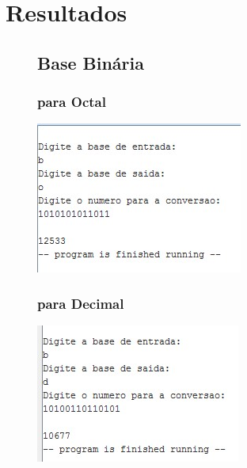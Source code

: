 \documentclass[10pt,a4paper]{article}
\begin{document}
\section{Resultados}
\begin{figure}[H]
\subsection{Base Binária}
\begin{minipage}[t]{.5\textwidth}
\subsubsection{para Octal}
\includegraphics[width=\textwidth]{BO.jpg}
\end{minipage}
\begin{minipage}[t]{.5\textwidth}
\subsubsection{para Decimal}
\includegraphics[width=\textwidth]{BD.jpg}
\end{minipage}
\begin{minipage}[t]{.5\textwidth}

\end{minipage}
\end{figure}
\end{document}
